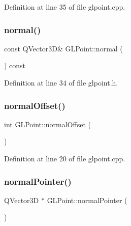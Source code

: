Definition at line 35 of file glpoint.\+cpp.

\mbox{\label{class_g_l_point_a4506f53f6b5312d3ec37cdbf566d57c8}} 
\subsubsection{\texorpdfstring{normal()}{normal()}}
{\footnotesize\ttfamily const Q\+Vector3D\& G\+L\+Point\+::normal (\begin{DoxyParamCaption}{ }\end{DoxyParamCaption}) const\hspace{0.3cm}{\ttfamily [inline]}}



Definition at line 34 of file glpoint.\+h.

\mbox{\label{class_g_l_point_a7625e2028fceb48d927236a03bfc3b75}} 
\subsubsection{\texorpdfstring{normalOffset()}{normalOffset()}}
{\footnotesize\ttfamily int G\+L\+Point\+::normal\+Offset (\begin{DoxyParamCaption}{ }\end{DoxyParamCaption})\hspace{0.3cm}{\ttfamily [static]}}



Definition at line 20 of file glpoint.\+cpp.

\mbox{\label{class_g_l_point_a453d3148640b4a6a5bb8596370f236f8}} 
\subsubsection{\texorpdfstring{normalPointer()}{normalPointer()}}
{\footnotesize\ttfamily Q\+Vector3D $\ast$ G\+L\+Point\+::normal\+Pointer (\begin{DoxyParamCaption}{ }\end{DoxyParamCaption})\hspace{0.3cm}{\ttfamily [inline]}}



